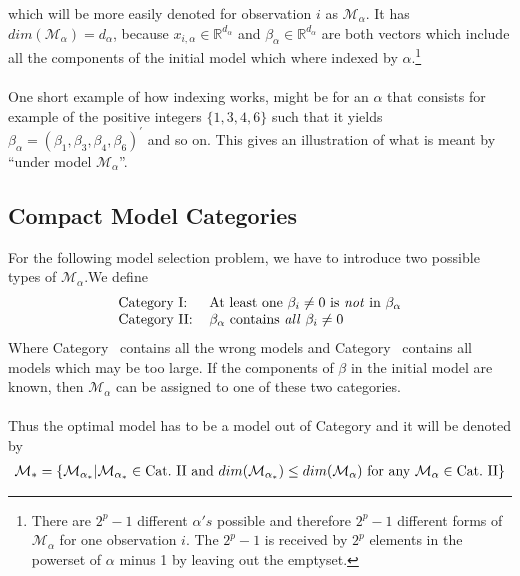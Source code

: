 \documentclass[Research_Module_ES.tex]{subfiles}
\begin{document}
which will be more easily denoted for observation $i$ as $\mathcal{M}_\alpha$. It has  $dim(\mathcal{M}_\alpha)=d_\alpha$, because $x_{i,\alpha}\in\mathbb{R}^{d_\alpha}$ and $\beta_\alpha\in\mathbb{R}^{d_\alpha}$ are both vectors which include all the components of the initial model which where indexed by $\alpha$.\footnote{There are $2^p-1$ different $\alpha's$ possible and therefore $2^p-1$ different forms of $\mathcal{M}_\alpha$ for one observation $i$. The $2^p-1$ is received by $2^p$ elements in the powerset of $\alpha$ minus 1 by leaving out the emptyset.}\\\\
One short example of how indexing works, might be for an $\alpha$ that consists for example of the positive integers $\{1,3,4,6\}$ such that it yields $\beta_\alpha=(\beta_1,\beta_3,\beta_4,\beta_6)^\prime$ and so on. This gives an illustration of what is meant by ``under model $\mathcal{M}_\alpha$''.

\subsection{Compact Model Categories} \label{chapter_compact_model}
For the following model selection problem, we have to introduce two possible types of $\mathcal{M}_\alpha$.We define
\begin{align*}
\begin{tabular}{ll}
Category~\RM{1}:& At least one $\beta_i\neq 0$ is \textit{not} in $\beta_\alpha$\\
Category~\RM{2}:& $\beta_\alpha$ contains \textit{all} $\beta_i\neq 0$
\end{tabular}
\end{align*}
Where Category~ contains all the wrong models and Category~ contains all models which may be too large. If the components of $\beta$ in the initial model are known, then $\mathcal{M}_\alpha$ can be assigned to one of these two categories.\\\\
Thus the optimal model has to be a model out of Category  and it will be denoted by
\begin{align*}
\mathcal{M}_\ast=\{\mathcal{M}_{\alpha_\ast}|\mathcal{M}_{\alpha_\ast}\in \text{Cat.~\RM{2}~and~} dim(\mathcal{M}_{\alpha_\ast})\leq dim(\mathcal{M}_{\alpha})\text{~for~any~}\mathcal{M}_{\alpha}\in \text{Cat.~\RM{2}} \}
\end{align*}
\end{document}
